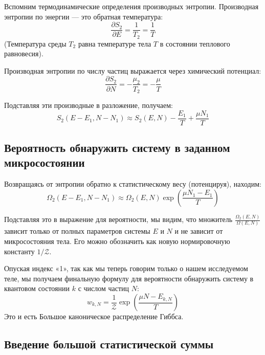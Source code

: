 \documentclass[../general/general]{subfiles}
\begin{document}
Вспомним термодинамические определения производных энтропии. Производная энтропии по энергии — это обратная температура:
\begin{equation*}
    \frac{\partial S_2}{\partial E} = \frac{1}{T_2} = \frac{1}{T}
\end{equation*}
(Температура среды $T_2$ равна температуре тела $T$ в состоянии теплового равновесия).

Производная энтропии по числу частиц выражается через химический потенциал:
\begin{equation*}
    \frac{\partial S_2}{\partial N} = -\frac{\mu_2}{T_2} = -\frac{\mu}{T}
\end{equation*}

Подставляя эти производные в разложение, получаем:
\begin{equation}
    S_2(E - E_1, N - N_1) \approx S_2(E, N) - \frac{E_1}{T} + \frac{\mu N_1}{T}
\end{equation}

\subsection{Вероятность обнаружить систему в заданном микросостоянии}

Возвращаясь от энтропии обратно к статистическому весу (потенцируя), находим:
\begin{equation*}
    \Omega_2(E - E_1, N - N_1) \approx \Omega_2(E, N) \exp\left( \frac{\mu N_1 - E_1}{T} \right)
\end{equation*}

Подставляя это в выражение для вероятности, мы видим, что множитель $\frac{\Omega_2(E, N)}{\Omega(E, N)}$ зависит только от полных параметров системы $E$ и $N$ и не зависит от микросостояния тела. Его можно обозначить как новую нормировочную константу $1/\mathcal{Z}$. 

Опуская индекс «1», так как мы теперь говорим только о нашем исследуемом теле, мы получаем финальную формулу для вероятности обнаружить систему в квантовом состоянии $k$ с числом частиц $N$:
\begin{equation}
    w_{k, N} = \frac{1}{\mathcal{Z}} \exp\left( \frac{\mu N - E_{k, N}}{T} \right)
    \label{eq:grand_canonical_prob}
\end{equation}
Это и есть Большое каноническое распределение Гиббса.

\subsection{Введение большой статистической суммы}
\end{document}
